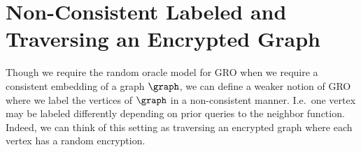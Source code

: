 \section{Non-Consistent Labeled and Traversing an Encrypted Graph}
Though we require the random oracle model for GRO when we require a consistent
embedding of a graph $\graph$, we can define a weaker notion of GRO where
we label the vertices of $\graph$ in a non-consistent manner. I.e.\ one vertex may be labeled
differently depending on prior queries to the neighbor function. Indeed, we can
think of this setting as traversing an encrypted graph where each vertex has a random encryption.

